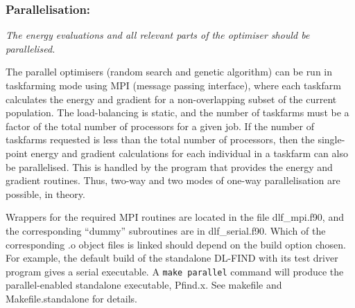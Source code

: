 \documentclass{article}
\begin{document}
\subsubsection{Parallelisation:}

\emph{The energy evaluations and all relevant parts of the optimiser should be
  parallelised.}

The parallel optimisers (random search and genetic algorithm) can be run
in taskfarming mode using MPI (message passing interface), where each taskfarm 
calculates the energy and gradient 
for a non-overlapping subset of the current population.  The load-balancing 
is static, and the number of taskfarms must be a factor of the total number of 
processors for a given job.  If the number of taskfarms requested is less than the
total number of processors, then the single-point energy and gradient calculations 
for each individual in a taskfarm can also be parallelised.  This is handled by
the program that provides the energy and gradient routines.  Thus, two-way 
and two modes of one-way parallelisation are possible, in theory.  

Wrappers for the required MPI routines are located in the file dlf\_mpi.f90, and the 
corresponding ``dummy'' subroutines are in dlf\_serial.f90.  Which of the corresponding 
.o object files is linked should depend on the build option chosen.  For example, the default build 
of the standalone DL-FIND with its test driver program gives a serial executable.
A \texttt{make parallel} command will produce the parallel-enabled standalone executable, 
Pfind.x.  See makefile and Makefile.standalone for details.

\end{document}
